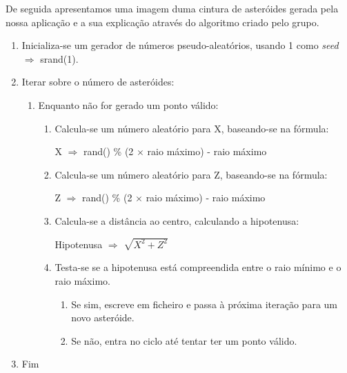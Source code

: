 \documentclass[a4paper]{article}
\begin{document}
De seguida apresentamos uma imagem duma cintura de asteróides gerada pela nossa aplicação e a sua explicação através do algoritmo criado pelo grupo.

 \ttfamily
\begin{enumerate}
  \item Inicializa-se um gerador de números pseudo-aleatórios, usando 1 como \emph{seed} $\Rightarrow$ srand(1).
  \item Iterar sobre o número de asteróides:
  \begin{enumerate}
    \item Enquanto não for gerado um ponto válido:
    \begin{enumerate}
    	\item Calcula-se um número aleatório para X, baseando-se na fórmula:

	 \vspace{0.5cm}

	 \hspace{0.0cm} X $\Rightarrow$ rand() \% (2 $\times$ raio máximo) - raio máximo

	 \vspace{0.5cm}

	 \item Calcula-se um número aleatório para Z, baseando-se na fórmula:

	 \vspace{0.5cm}

	 \hspace{0.0cm} Z $\Rightarrow$ rand() \% (2 $\times$ raio máximo) - raio máximo

	 \vspace{0.5cm}

	 \item Calcula-se a distância ao centro, calculando a hipotenusa:

	 \vspace{0.5cm}

	 \hspace{0.0cm} Hipotenusa $\Rightarrow$ $\sqrt{X^2 + Z^2}$

	 \vspace{0.5cm}

	 \item Testa-se se a hipotenusa está compreendida entre o raio mínimo e o raio máximo.
	 \begin{enumerate}
	 \item Se sim, escreve em ficheiro e passa à próxima iteração para um novo asteróide.
	 \item Se não, entra no ciclo até tentar ter um ponto válido.
	 \end{enumerate}

    \end{enumerate}

    \end{enumerate}

    \item Fim
    \end{enumerate}
    \rmfamily
\end{document}
